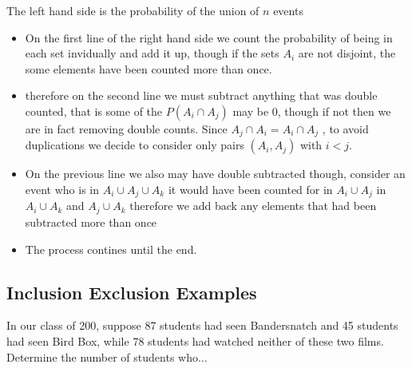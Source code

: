 \documentclass[11pt]{book}
\begin{document}
The left hand side is the probability of the union of $n$ events

\begin{itemize}
    \item On the first line of the right hand side we count the probability of being in each set invidually and add it up, though if the sets $A_{i} $ are not disjoint, the some elements have been counted more than once.
    \item therefore on the second line we must subtract anything that was double counted, that is some of the $P\left(A_{i} \cap A_{j} \right) $ may be 0, though if not then we are in fact removing double counts. Since $A_{j} \cap A_{i} = A_{i} \cap A_{j} $ , to avoid duplications we decide to consider only pairs $(A_{i} , A_{j} )$ with $i < j$.
    \item On the previous line we also may have double subtracted though, consider an event who is in $A_{i} \cup A_{j} \cup A_{k} $ it would have been counted for in $A_{i} \cup A_{j} $ in $A_{i} \cup A_{k} $ and $A_{j}\cup  A_{k} $  therefore we add back any elements that had been subtracted more than once
    \item The process contines until the end.
\end{itemize}

\subsection{Inclusion Exclusion Examples}%
\label{sub:inclusion_exclusion_examples}

In our class of 200, suppose 87 students had seen Bandersnatch and 45
students had seen Bird Box, while 78 students had watched neither of
these two films. Determine the number of students who...
\end{document}

